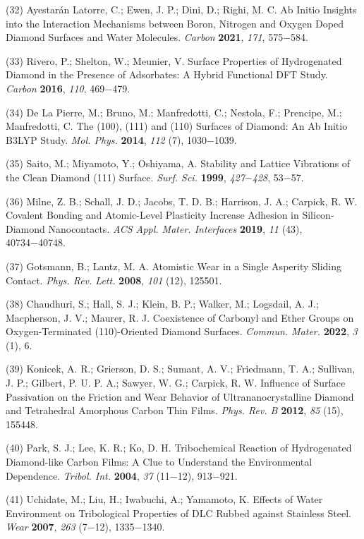 \documentclass{article}
\begin{document}
\begin{hangpars}
(32) Ayestarán Latorre, C.; Ewen, J. P.; Dini, D.; Righi, M. C. Ab Initio Insights into the Interaction Mechanisms between Boron, Nitrogen and Oxygen Doped Diamond Surfaces and Water Molecules. \textit{Carbon} \textbf{2021}, \textit{171}, 575−584.

(33) Rivero, P.; Shelton, W.; Meunier, V. Surface Properties of Hydrogenated Diamond in the Presence of Adsorbates: A Hybrid Functional DFT Study. \textit{Carbon} \textbf{2016}, \textit{110}, 469−479.

(34) De La Pierre, M.; Bruno, M.; Manfredotti, C.; Nestola, F.; Prencipe, M.; Manfredotti, C. The (100), (111) and (110) Surfaces of Diamond: An Ab Initio B3LYP Study. \textit{Mol. Phys.} \textbf{2014}, \textit{112} (7), 1030−1039.

(35) Saito, M.; Miyamoto, Y.; Oshiyama, A. Stability and Lattice Vibrations of the Clean Diamond (111) Surface. \textit{Surf. Sci.} \textbf{1999}, \textit{427}−\textit{428}, 53−57.

(36) Milne, Z. B.; Schall, J. D.; Jacobs, T. D. B.; Harrison, J. A.; Carpick, R. W. Covalent Bonding and Atomic-Level Plasticity Increase Adhesion in Silicon-Diamond Nanocontacts. \textit{ACS Appl. Mater. Interfaces} \textbf{2019}, \textit{11} (43), 40734−40748.

(37) Gotsmann, B.; Lantz, M. A. Atomistic Wear in a Single Asperity Sliding Contact. \textit{Phys. Rev. Lett.} \textbf{2008}, \textit{101} (12), 125501.

(38) Chaudhuri, S.; Hall, S. J.; Klein, B. P.; Walker, M.; Logsdail, A. J.; Macpherson, J. V.; Maurer, R. J. Coexistence of Carbonyl and Ether Groups on Oxygen-Terminated (110)-Oriented Diamond Surfaces. \textit{Commun. Mater.} \textbf{2022}, \textit{3} (1), 6.

(39) Konicek, A. R.; Grierson, D. S.; Sumant, A. V.; Friedmann, T. A.; Sullivan, J. P.; Gilbert, P. U. P. A.; Sawyer, W. G.; Carpick, R. W. Influence of Surface Passivation on the Friction and Wear Behavior of Ultrananocrystalline Diamond and Tetrahedral Amorphous Carbon Thin Films. \textit{Phys. Rev. B} \textbf{2012}, \textit{85} (15), 155448.

(40) Park, S. J.; Lee, K. R.; Ko, D. H. Tribochemical Reaction of Hydrogenated Diamond-like Carbon Films: A Clue to Understand the Environmental Dependence. \textit{Tribol. Int.} \textbf{2004}, \textit{37} (11−12), 913−921.

(41) Uchidate, M.; Liu, H.; Iwabuchi, A.; Yamamoto, K. Effects of Water Environment on Tribological Properties of DLC Rubbed against Stainless Steel. \textit{Wear} \textbf{2007}, \textit{263} (7−12), 1335−1340.


\end{hangpars}
\end{document}
